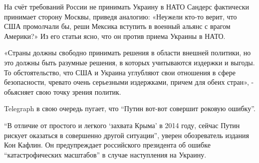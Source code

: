 \begin{multicols}{3}
На счёт требований России не принимать Украину в НАТО Сандерс фактически
принимает сторону Москвы, приведя аналогию: «Неужели кто-то верит, что США
промолчали бы, реши Мексика вступить в военный альянс с врагом Америки?» Из его
статьи ясно, что он против приема Украины в НАТО.

«Страны должны свободно принимать решения в области внешней политики, но это
должны быть разумные решения, в которых учитываются издержки и выгоды. То
обстоятельство, что США и Украина углубляют свои отношения в сфере
безопасности, чревато очень серьезными издержками, причем для обеих стран», -
обьясняет свою точку зрения политик.

Telegraph в свою очередь пугает, что \enquote{Путин вот-вот совершит роковую
ошибку}.

\enquote{В отличие от простого и легкого \enquote{захвата Крыма} в 2014 году,
сейчас Путин рискует оказаться в совершенно другой ситуации}, уверен
обозреватель издания Кон Кафлин. Он предупреждает российского президента об
ошибке \enquote{катастрофических масштабов} в случае наступления на Украину.  


\end{multicols} %
